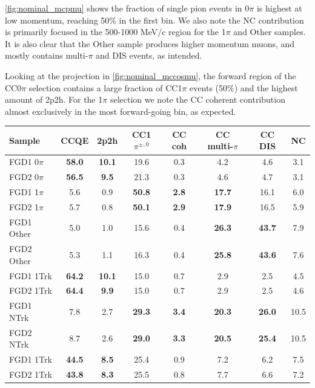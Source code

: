 \autoref{fig:nominal_mcpmu} shows the fraction of single pion events in 0$\pi$ is highest at low momentum, reaching 50\% in the first bin. We also note the NC contribution is primarily focused in the 500-1000 MeV/c region for the 1$\pi$ and Other samples. It is also clear that the Other sample produces higher momentum muons, and mostly contains multi-$\pi$ and DIS events, as intended. 

Looking at the \cosmu projection in \autoref{fig:nominal_mccosmu}, the forward region of the CC0$\pi$ selection contains a large fraction of CC1$\pi$ events (50\%) and the highest amount of 2p2h. For the 1$\pi$ selection we note the CC coherent contribution almost exclusively in the most forward-going bin, as expected.
\begin{table}
	\begin{tabular}{l | c c c c c c | c}
		\hline
		\hline
		Sample 			& CCQE & 2p2h & CC1$\pi^{\pm,0}$ 	& CC coh 	& CC multi-$\pi$ & CC DIS  	& NC \\
		\hline
		FGD1 0$\pi$	    & \textbf{58.0} & \textbf{10.1} & 19.6 & 0.3 & 4.2 & 4.6 & 3.1 \\
		FGD2 0$\pi$	    & \textbf{56.5} & \textbf{9.5}  & 21.3 & 0.3 & 4.6 & 4.7 & 3.1 \\
		\hline
		FGD1 1$\pi$	    & 5.6 & 0.9 & \textbf{50.8} & \textbf{2.8} & \textbf{17.7} & 16.1 & 6.0 \\
		FGD2 1$\pi$	    & 5.7 & 0.8 & \textbf{50.1} & \textbf{2.9} & \textbf{17.9} & 16.5 & 5.9 \\
		\hline
		FGD1 Other	    & 5.0 & 1.0 & 15.6 & 0.4 & \textbf{26.3} & \textbf{43.7} & 7.9 \\
		FGD2 Other	    & 5.3 & 1.1 & 16.3 & 0.4 & \textbf{25.8} & \textbf{43.6} & 7.6 \\
		\hline
		FGD1 1Trk	    	& \textbf{64.2} & \textbf{10.1} & 15.0 & 0.7 & 2.9 & 2.5 & 4.5 \\
		FGD2 1Trk	    	& \textbf{64.4} & \textbf{9.9} & 15.0 & 0.7 & 2.9 & 2.5 & 4.6 \\
		\hline
		FGD1 NTrk	    	& 7.8 & 2.7 & \textbf{29.3} & \textbf{3.4} & \textbf{20.3} & \textbf{26.0} & 10.5 \\ 
		FGD2 NTrk	  		& 8.7 & 2.6 & \textbf{29.0} & \textbf{3.3} & \textbf{20.5} & \textbf{25.4} & 10.5 \\
		\hline
		FGD1 1Trk   \numu 	& \textbf{44.5} & \textbf{8.5} & 25.4 & 0.9 & 7.2 & 6.2 & 7.5 \\
		FGD2 1Trk	\numu   & \textbf{43.8} & \textbf{8.3} & 25.5 & 0.8 & 7.7 & 6.6 & 7.2 \\

\end{tabular}
\end{table}
